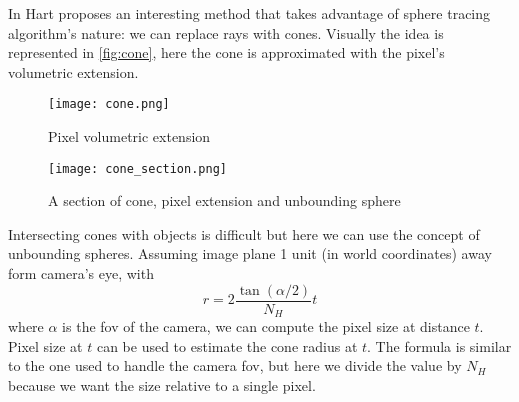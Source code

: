 In \cite{hart1996} Hart proposes an interesting method that takes advantage of sphere tracing algorithm's nature: we can replace rays with cones.
Visually the idea is represented in \autoref{fig:cone}, here the cone is approximated with the pixel's volumetric extension.
\begin{figure}[!htb]
  \texttt{[image: cone.png]}
  \caption{Pixel volumetric extension}
  \label{fig:cone}
\endminipage\hfill
{}
  \texttt{[image: cone\_section.png]}
  \caption{A section of cone, pixel extension and unbounding sphere}
  \label{fig:cone_section}
\endminipage
\end{figure}
Intersecting cones with objects is difficult but here we can use the concept of unbounding spheres.
Assuming image plane 1 unit (in world coordinates) away form camera's eye, with
$$r = 2 \dfrac {\tan(\alpha / 2)}{N_H} t$$
where $\alpha$ is the fov of the camera, we can compute the pixel size at distance $t$.
Pixel size at $t$ can be used to estimate the cone radius at $t$.
The formula is similar to the one used to handle the camera fov, but here we divide the value by $N_H$ because we want the size relative to a single pixel.

